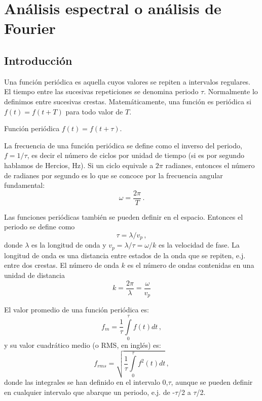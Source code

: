 \documentclass[
]{agujournal2019}
\begin{document}
\hypertarget{anuxe1lisis-espectral-o-anuxe1lisis-de-fourier}{%
\section{Análisis espectral o análisis de
Fourier}\label{anuxe1lisis-espectral-o-anuxe1lisis-de-fourier}}

\hypertarget{introducciuxf3n}{%
\subsection{Introducción}\label{introducciuxf3n}}

Una función periódica es aquella cuyos valores se repiten a intervalos
regulares. El tiempo entre las sucesivas repeticiones se denomina
periodo \(\tau\). Normalmente lo definimos entre sucesivas crestas.
Matemáticamente, una función es periódica si \(f(t)=f(t+T)\) para todo
valor de \(T\).

\begin{center}
\end{center}
\begin{center}
Función periódica $f(t)=f(t+\tau)$.
\end{center}

La frecuencia de una función periódica se define como el inverso del
periodo, \(f=1/\tau\), es decir el número de ciclos por unidad de tiempo
(si es por segundo hablamos de Hercios, Hz). Si un ciclo equivale a
\(2\pi\) radianes, entonces el número de radianes por segundo es lo que
se concoce por la frecuencia angular fundamental:
\[\omega=\frac{2\pi}{T}\,.\]

Las funciones periódicas también se pueden definir en el espacio.
Entonces el periodo se define como \[\tau=\lambda/v_p\,,\] donde
\(\lambda\) es la longitud de onda y \(v_p=\lambda/\tau=\omega/k\) es la
velocidad de fase. La longitud de onda es una distancia entre estados de
la onda que se repiten, e.j. entre dos crestas. El número de onda \(k\)
es el número de ondas contenidas en una unidad de distancia
\[k=\frac{2\pi}{\lambda}=\frac{\omega}{v_p}\]

El valor promedio de una función periódica es:
\[f_m=\frac{1}{\tau}\int\limits^{\tau}_0 f(t) dt\,,\] y su valor
cuadrático medio (o RMS, en inglés) es:
\[f_{rms}=\sqrt{\frac{1}{\tau}\int\limits^{\tau}_0 f^2(t) dt}\,,\] donde
las integrales se han definido en el intervalo 0,\(\tau\), aunque se
pueden definir en cualquier intervalo que abarque un periodo, e.j. de
-\(\tau\)/2 a \(\tau\)/2.
\end{document}
